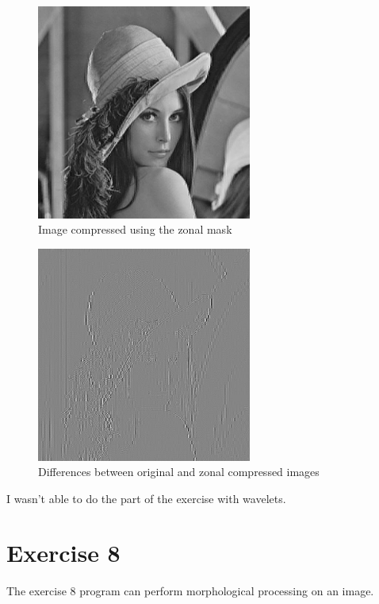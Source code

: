 \documentclass[10pt]{article}
\begin{document}
\begin{figure}[!ht]
	\centering
	\includegraphics[height=200pt]{./ex7/threshold.jpg}
	\caption{Image compressed using the zonal mask}
\end{figure}
\begin{figure}[!ht]
	\centering
	\includegraphics[height=200pt]{./ex7/thresholddiff.jpg}
	\caption{Differences between original and zonal compressed images}
\end{figure}

\clearpage

I wasn't able to do the part of the exercise with wavelets.

\section{Exercise 8}
The exercise 8 program can perform morphological processing on an image.




\clearpage
\end{document}

